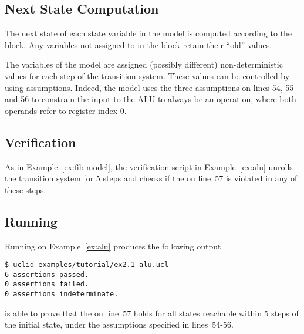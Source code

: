 \subsection{Next State Computation}
The next state of each state variable in the model is computed according to the  block. Any variables not assigned to in the  block retain their ``old'' values. 

The  variables of the model are assigned (possibly different) non-deterministic values for each step of the transition system. These values can be controlled by using assumptions. Indeed, the model uses the three assumptions on lines 54, 55 and 56 to constrain the input to the ALU to always be an  operation, where both operands refer to register index 0. 

\subsection{Verification}
As in Example~\ref{ex:fib-model}, the verification script in Example~\ref{ex:alu} unrolls the transition system for 5 steps and checks if the  on line~57 is violated in any of these steps. 

\subsection{Running \uclid{}}

Running \uclid{} on Example~\ref{ex:alu} produces the following output.

\begin{Verbatim}[frame=single, samepage=true]
$ uclid examples/tutorial/ex2.1-alu.ucl 
6 assertions passed.
0 assertions failed.
0 assertions indeterminate.
\end{Verbatim}

\uclid{} is able to prove that the  on line~57 holds for all states reachable within 5 steps of the initial state, under the assumptions specified in lines~54-56.
